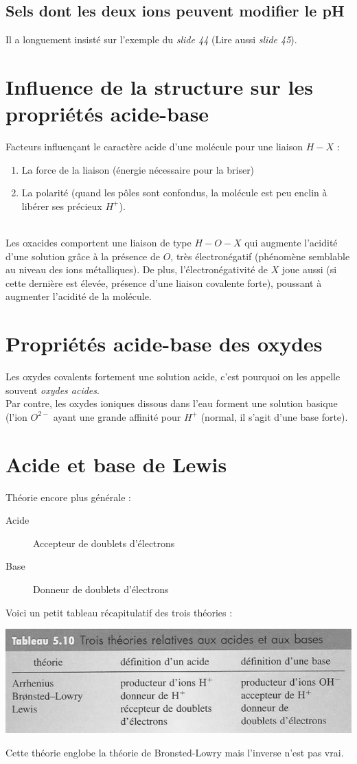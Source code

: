 \documentclass[british,french,11pt, a4paper, openany]{book}
\begin{document}
\subsection{Sels dont les deux ions peuvent modifier le pH}
Il a longuement insisté sur l'exemple du \textit{slide 44} (Lire aussi \textit{slide 45}).

\section{Influence de la structure sur les propriétés acide-base}
Facteurs influençant le caractère acide d'une molécule pour une liaison $H-X$ : 
\begin{enumerate}
	\item La force de la liaison (énergie nécessaire pour la briser)
	\item La polarité (quand les pôles sont confondus, la molécule est peu enclin à libérer ses précieux $H^+$).
\end{enumerate}
\ \\
Les oxacides comportent une liaison de type $H-O-X$ qui augmente l'acidité d'une solution grâce à la présence de $O$, très électronégatif (phénomène semblable au niveau des ions métalliques). De plus, l'électronégativité de $X$ joue aussi (si cette dernière est élevée, présence d'une liaison covalente forte), poussant à augmenter l'acidité de la molécule.

\section{Propriétés acide-base des oxydes}
Les oxydes covalents fortement une solution acide, c'est pourquoi on les appelle souvent \textit{oxydes acides}.\\
Par contre, les oxydes ioniques dissous dans l'eau forment une solution basique (l'ion $O^{2-}$ ayant une grande affinité pour $H^+$ (normal, il s'agit d'une base forte). 

\section{Acide et base de Lewis}
Théorie encore plus générale :
\begin{description}
	\item[Acide] Accepteur de doublets d'électrons
	\item[Base] Donneur de doublets d'électrons
\end{description}
Voici un petit tableau récapitulatif des trois théories : 
\begin{center}
	\includegraphics[scale=0.55]{image13.png}\\
\end{center}
Cette théorie englobe la théorie de Bronsted-Lowry mais l'inverse n'est pas vrai.
\end{document}
